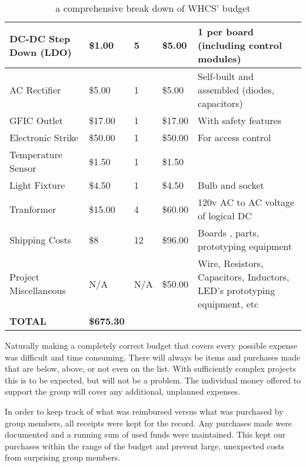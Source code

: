 \begin{table}[H]
{\begin{tabular}{|b{4.5cm}|l|l|l|b{4cm}|}
{\color{black} DC{}-DC Step Down (LDO)} &
{\color{black} \$1.00} &
{\color{black} 5} &
{\color{black} \$5.00} &
{\color{black} 1 per board (including control modules)}\\\hline
{\color{black} AC Rectifier} &
{\color{black} \$5.00} &
{\color{black} 1} &
{\color{black} \$5.00} &
{\color{black} Self{}-built and assembled (diodes, capacitors)}\\\hline
{\color{black} GFIC Outlet} &
{\color{black} \$17.00} &
{\color{black} 1} &
{\color{black} \$17.00} &
{\color{black} With safety features}\\\hline
{\color{black} Electronic Strike} &
{\color{black} \$50.00} &
{\color{black} 1} &
{\color{black} \$50.00} &
{\color{black} For access control}\\\hline
{\color{black} Temperature Sensor} &
{\color{black} \$1.50} &
{\color{black} 1} &
{\color{black} \$1.50} &
\\\hline
{\color{black} Light Fixture} &
{\color{black} \$4.50} &
{\color{black} 1} &
{\color{black} \$4.50} &
{\color{black} Bulb and socket}\\\hline
{\color{black} Tranformer} &
{\color{black} \$15.00} &
{\color{black} 4} &
{\color{black} \$60.00} &
{\color{black} 120v AC to AC voltage of logical DC}\\\hline
{\color{black} Shipping Costs} &
{\color{black} \$8} &
{\color{black} 12} &
{\color{black} \$96.00} &
{\color{black} Boards , parts, prototyping equipment}\\\hline
{\color{black} Project Miscellaneous} &
{\color{black} N/A} &
{\color{black} N/A} &
{\color{black} \$50.00} &
{\color{black} Wire, Resistors, Capacitors, Inductors, LED{}'s prototyping equipment, etc}\\\hline
{\color{black} \textbf{TOTAL}} &
{\color{black} \textbf{\$675.30}} &
 &
 &
\\\hline
\end{tabular}
}
\caption{a comprehensive break down of WHCS' budget}
\label{tab:budget}
\end{table}

Naturally making a completely correct budget that covers every possible expense
was difficult and time consuming. There will always be items and purchases made
that are below, above, or not even on the list. With sufficiently complex
projects this is to be expected, but will not be a problem. The individual
money offered to support the group will cover any additional, unplanned
expenses.

In order to keep track of what was reimbursed versus what was purchased by
group members, all receipts were kept for the record. Any purchases made were
documented and a running sum of used funds were maintained. This kept
our purchases within the range of the budget and prevent large, unexpected
costs from surprising group members.


